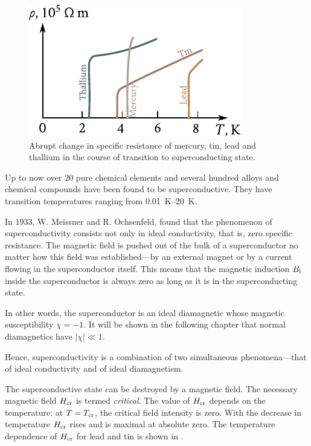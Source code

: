 \begin{figure}[t]
	\begin{center}
		\includegraphics[scale=1.1]{figures/ch_06/fig_6_26.pdf}
		\caption[]{Abrupt change in specific resistance of mercury, tin, lead and thallium in the course of transition to superconducting state.}
		\label{fig:6_26}
	\end{center}
	\vspace{-0.7cm}
\end{figure}

Up to now over $20$ pure chemical elements and several hundred alloys and chemical compounds have been found to be superconductive. They have transition temperatures ranging from \SIrange{0.01}{20}{\kelvin}.

In 1933, W. Meissner and R. Ochsenfeld, found that the phenomenon of superconductivity consists not only in ideal conductivity, that is, zero specific resistance. The magnetic field is pushed out of the bulk of a superconductor no matter how this field was established---by an external magnet or by a current flowing in the superconductor itself. This means that the magnetic induction $B_{\text{i}}$ inside the superconductor is always zero as long as it is in the superconducting state.

In other words, the superconductor is an ideal diamagnetic whose magnetic susceptibility $\chi=-1$. It will be shown in the following chapter that normal diamagnetics have $|\chi|\ll 1$.

Hence, superconductivity is a combination of two simultaneous phenomena---that of ideal conductivity and of ideal diamagnetism.

The superconductive state can be destroyed by a magnetic field. The necessary magnetic field $H_{\text{cr}}$ is termed \textit{critical}. The value of $H_{\text{cr}}$ depends on the temperature: at $T=T_{\text{cr}}$, the critical field intensity is zero. With the decrease in temperature $H_{\text{cr}}$ rises and is maximal at absolute zero. The temperature dependence of $H_{\text{cr}}$ for lead and
tin is shown in .

